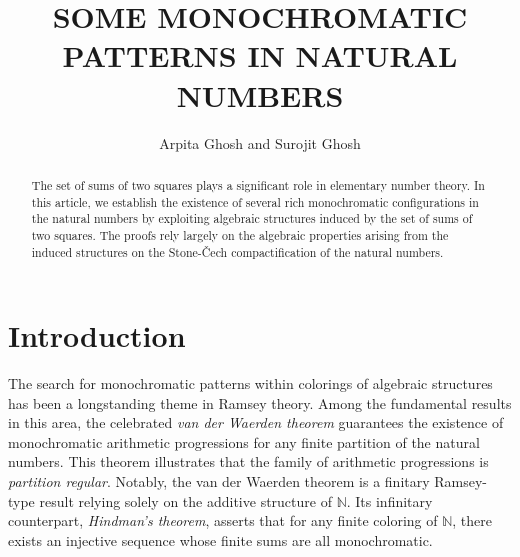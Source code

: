 \documentclass[12pt]{amsart}
\theoremstyle{plain}
\theoremstyle{definition}
\theoremstyle{remark}
\numberwithin{equation}{section}
\begin{document}
\title{SOME MONOCHROMATIC PATTERNS IN NATURAL NUMBERS}


\author{Arpita Ghosh and Surojit Ghosh}











\maketitle
\begin{abstract}
The set of sums of two squares plays a significant role in elementary number theory. In this article, we establish the existence of several rich monochromatic configurations in the natural numbers by exploiting algebraic structures induced by the set of sums of two squares. The proofs rely largely on the algebraic properties arising from the induced structures on the Stone-\v{C}ech compactification of the natural numbers.




\end{abstract}

\section{Introduction}
The search for monochromatic patterns within colorings of algebraic structures has been a longstanding theme in Ramsey theory. Among the fundamental results in this area, the celebrated \emph{van der Waerden theorem} guarantees the existence of monochromatic arithmetic progressions for any finite partition of the natural numbers. This theorem illustrates that the family of arithmetic progressions is \emph{partition regular}. Notably, the van der Waerden theorem is a finitary Ramsey-type result relying solely on the additive structure of $\mathbb{N}$. Its infinitary counterpart, \emph{Hindman's theorem}, asserts that for any finite coloring of $\mathbb{N}$, there exists an injective sequence whose finite sums are all monochromatic.
\end{document}
